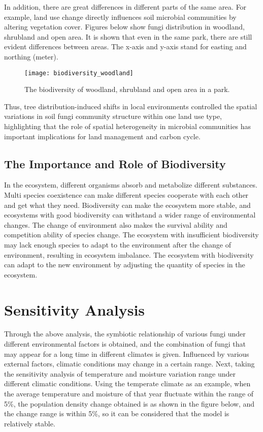 \documentclass{mcmthesis}
\begin{document}
In addition, there are great differences in different parts of the same area. For example, land use change directly influences soil microbial communities by altering vegetation cover\cite{li2019spatial}. Figures below show fungi distribution in woodland, shrubland and open area. It is shown that even in the same park, there are still evident differences between areas. The x-axis and y-axis stand for easting and northing (meter).

\begin{figure}[H]
  \small
  \centering
  \texttt{[image: biodiversity\_woodland]}
  \caption{The biodiversity of woodland, shrubland and open area in a park\cite{li2019spatial}.}
  \label{biodiversity_woodland}
\end{figure}

Thus, tree distribution-induced shifts in local environments controlled the spatial variations in soil fungi community structure within one land use type, highlighting that the role of spatial heterogeneity in microbial communities has important implications for land management and carbon cycle.

\subsection{The Importance and Role of Biodiversity }

In the ecosystem, different organisms absorb and metabolize different substances. Multi species coexistence can make different species cooperate with each other and get what they need. Biodiversity can make the ecosystem more stable, and ecosystems with good biodiversity can withstand a wider range of environmental changes. The change of environment also makes the survival ability and competition ability of species change. The ecosystem with insufficient biodiversity may lack enough species to adapt to the environment after the change of environment, resulting in ecosystem imbalance. The ecosystem with biodiversity can adapt to the new environment by adjusting the quantity of species in the ecosystem.

\section{Sensitivity Analysis }

Through the above analysis, the symbiotic relationship of various fungi under different environmental factors is obtained, and the combination of fungi that may appear for a long time in different climates is given. Influenced by various external factors, climatic conditions may change in a certain range. Next, taking the sensitivity analysis of temperature and moisture variation range under different climatic conditions. Using the temperate climate as an example, when the average temperature and moisture of that year fluctuate within the range of 5\%, the population density change obtained is as shown in the figure below, and the change range is within 5\%, so it can be considered that the model is relatively stable.
\end{document}
